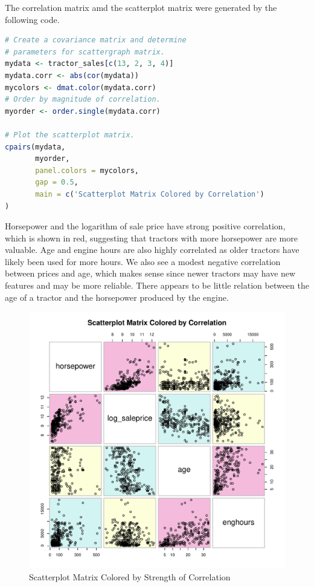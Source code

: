 \documentclass[11pt]{book}
\begin{document}


The correlation matrix amd the scatterplot matrix
were generated by the following code.

\begin{lstlisting}[language=R]
# Create a covariance matrix and determine
# parameters for scattergraph matrix.
mydata <- tractor_sales[c(13, 2, 3, 4)]
mydata.corr <- abs(cor(mydata))
mycolors <- dmat.color(mydata.corr)
# Order by magnitude of correlation.
myorder <- order.single(mydata.corr)

# Plot the scatterplot matrix.
cpairs(mydata,
       myorder,
       panel.colors = mycolors,
       gap = 0.5,
       main = c('Scatterplot Matrix Colored by Correlation')
)
\end{lstlisting}


\pagebreak
Horsepower and the logarithm of sale price have strong positive correlation, which is shown in red,
suggesting that tractors with more horsepower are more valuable.
Age and engine hours are also highly correlated
as older tractors have likely been used for more hours.
We also see a modest negative correlation between prices and age,
which makes sense since newer tractors may have new features and may be more reliable.
There appears to be little relation between the
age of a tractor and the horsepower produced by the engine.

\begin{figure}[h!]
  \centering
  \includegraphics[scale = 0.5, keepaspectratio=true]{../Figures/scatter_matrix}
  \caption{Scatterplot Matrix Colored by Strength of Correlation} \label{fig:scatter_matrix}
\end{figure}
\end{document}

